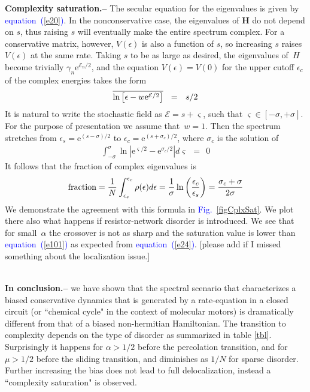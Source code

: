 \documentclass[aps,pre,floats,floatfix,twocolumn]{revtex4}
\newcommand{\eexp}[1]{\mathrm{e}^{#1}}
\newcommand{\be}[1]{\begin{eqnarray}\ifthenelse{#1=-1}{\nonumber}{\ifthenelse{#1=0}{}{\label{e#1}}}}
\newcommand{\beq}{\begin{eqnarray}}
\newcommand{\eeq}{\end{eqnarray}}
\newcommand{\Eq}[1]{\textcolor{blue}{{equation}\!~(\ref{#1})}}
\newcommand{\Fig}[1]{\textcolor{blue}{Fig.}\!\!~\ref{#1}}
\newcommand{\sect}[1]{{\bf #1.-- }}
\newcommand{\rmrk}[1]{{\color[rgb]{0.6,0,0.1} #1}}
\begin{document}
\sect{Complexity saturation}
%
The secular equation for the eigenvalues is given by \Eq{e20}.
%
In the nonconservative case, the eigenvalues of $\bm{H}$ do not depend on $s$,
thus raising $s$ will eventually make the entire spectrum complex. 
For a conservative matrix, however, $V(\epsilon)$ is also a function of $s$, 
so increasing $s$ raises $V(\epsilon)$  at the same rate.
%
Taking $s$ to be as large as desired, the eigenvalues of~$H$ 
become trivially $\gamma_{n}\eexp{\mathcal{E}_n/2}$, 
and the equation $V(\epsilon)=V(0)$ for the upper cutoff $\epsilon_c$ 
of the complex energies takes the form
%
\be{24}
\overline{\ln\left[ \epsilon - w\eexp{\mathcal{E}/2} \right]} \ \ = \ \ s/2 
\eeq
%
It is natural to write the stochastic field as $\mathcal{E}=s+\varsigma$, 
such that ${\varsigma\in[-\sigma,+\sigma]}$. 
For the purpose of presentation we assume that~$w{=}1$.  
Then the spectrum stretches from $\epsilon_s=\eexp{(s-\sigma)/2}$ 
to ${\epsilon_c=\eexp{(s+\sigma_c)/2}}$,  
where $\sigma_c$ is the solution of
%
\beq
\int_{-\sigma}^{\sigma} \ln \left| \eexp{{\varsigma}/2} - \eexp{\sigma_c /2}\right| d\varsigma  \ \ = \ \ 0 
\eeq
% 
It follows that the fraction of complex eigenvalues is 
%
\be{101}
\text{fraction} 
= \frac{1}{N}\int_{\epsilon_s}^{\epsilon_c} \rho(\epsilon) d\epsilon
= \frac{1}{\sigma}\ln\left( \frac{\epsilon_c}{\epsilon_s} \right) 
= \frac{\sigma_c + \sigma}{2\sigma}
\eeq
%
We demonstrate the agreement with this formula in \Fig{figCplxSat}.
We plot there also what happens if resistor-network disorder is introduced.
We see that for small~$\alpha$ the crossover is not as sharp and 
the saturation value is lower than \Eq{e101} as expected from \Eq{e24}. 
\rmrk{[please add if I missed something about the localization issue.]}












\ \\

\sect{In conclusion}  
we have shown that the spectral scenario that characterizes a biased conservative dynamics 
that is generated by a rate-equation in a closed circuit (or ``chemical cycle" in the context 
of molecular motors) is dramatically different from that of a biased non-hermitian Hamiltonian. 
The transition to complexity depends on the type of disorder as summarized in table \ref{tbl}. 
Surprisingly it happens for ${\alpha>1/2}$ before the percolation transition, 
and for ${\mu>1/2}$ before the sliding transition, and diminishes as $1/N$ for sparse disorder.
Further increasing the bias does not lead to full delocalization, instead a ``complexity saturation" is observed.
\end{document}
